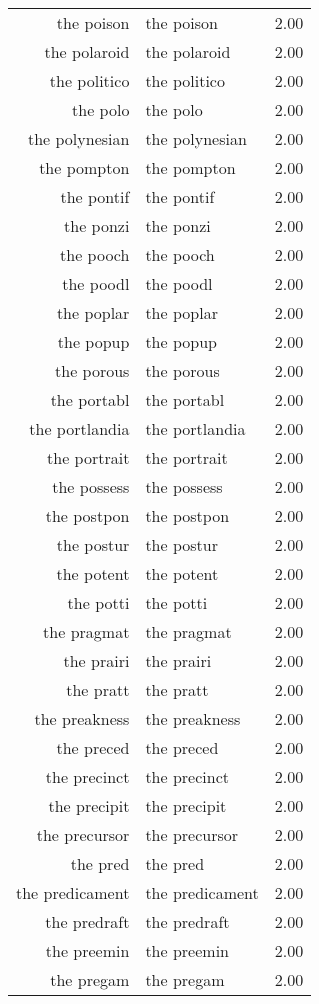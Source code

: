 \begin{table}[ht]
\begin{tabular}{rlr}
  the poison & the poison & 2.00 \\ 
  the polaroid & the polaroid & 2.00 \\ 
  the politico & the politico & 2.00 \\ 
  the polo & the polo & 2.00 \\ 
  the polynesian & the polynesian & 2.00 \\ 
  the pompton & the pompton & 2.00 \\ 
  the pontif & the pontif & 2.00 \\ 
  the ponzi & the ponzi & 2.00 \\ 
  the pooch & the pooch & 2.00 \\ 
  the poodl & the poodl & 2.00 \\ 
  the poplar & the poplar & 2.00 \\ 
  the popup & the popup & 2.00 \\ 
  the porous & the porous & 2.00 \\ 
  the portabl & the portabl & 2.00 \\ 
  the portlandia & the portlandia & 2.00 \\ 
  the portrait & the portrait & 2.00 \\ 
  the possess & the possess & 2.00 \\ 
  the postpon & the postpon & 2.00 \\ 
  the postur & the postur & 2.00 \\ 
  the potent & the potent & 2.00 \\ 
  the potti & the potti & 2.00 \\ 
  the pragmat & the pragmat & 2.00 \\ 
  the prairi & the prairi & 2.00 \\ 
  the pratt & the pratt & 2.00 \\ 
  the preakness & the preakness & 2.00 \\ 
  the preced & the preced & 2.00 \\ 
  the precinct & the precinct & 2.00 \\ 
  the precipit & the precipit & 2.00 \\ 
  the precursor & the precursor & 2.00 \\ 
  the pred & the pred & 2.00 \\ 
  the predicament & the predicament & 2.00 \\ 
  the predraft & the predraft & 2.00 \\ 
  the preemin & the preemin & 2.00 \\ 
  the pregam & the pregam & 2.00 \\ 

\end{tabular}
\end{table}
